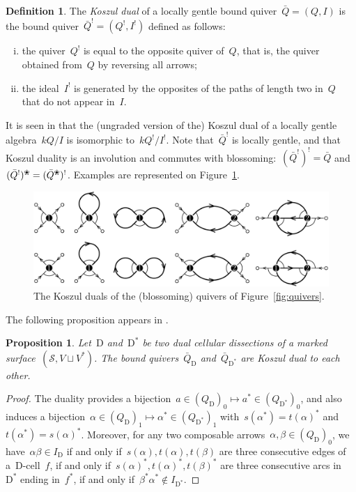 \documentclass{amsart}
\newtheorem{proposition}[theorem]{Proposition}
\theoremstyle{definition}
\newtheorem{definition}[theorem]{Definition}
\newcommand{\fref}[1]{Figure~\ref{#1}} %
\newcommand{\darkblue}{\color{darkblue}} %
\newcommand{\defn}[1]{\textsl{\darkblue #1}} %
\newcommand{\blossom}{^\text{\ding{96}}} %
\newcommand{\surface}{\mathcal{S}} %
\newcommand{\dual}{^*} %
\newcommand{\dissection}{\mathrm{D}} %
\newcommand{\koszul}{^!} %
\begin{document}
\begin{definition}
\label{defi:koszulDual}
The \defn{Koszul dual} of a locally gentle bound quiver~$\bar Q = (Q,I)$ is the bound quiver~$\bar Q\koszul = (Q\koszul, I\koszul)$ defined as follows:
\begin{enumerate}[(i)]
 \item the quiver~$Q\koszul$ is equal to the opposite quiver of~$Q$, that is, the quiver obtained from~$Q$ by reversing all arrows;
 \item the ideal~$I\koszul$ is generated by the opposites of the paths of length two in~$Q$ that do not appear in~$I$.
\end{enumerate}
\end{definition}
It is seen in \cite{BessenrodtHolm} that the (ungraded version of the) Koszul dual of a locally gentle algebra~$kQ/I$ is isomorphic to~$kQ\koszul/I\koszul$.
Note that~$\bar Q\koszul$ is locally gentle, and that Koszul duality is an involution and commutes with blossoming:~$(\bar Q\koszul)\koszul = \bar Q$ and~$(\bar Q\koszul)\blossom = (\bar Q\blossom)\koszul$.
Examples are represented on \fref{fig:koszulQuivers}.

\begin{figure}[t]
	\capstart
	\centerline{\includegraphics[scale=.6]{koszulQuivers}}
	\caption{The Koszul duals of the (blossoming) quivers of \fref{fig:quivers}.}
	\label{fig:koszulQuivers}
\end{figure}

The following proposition appears in \cite[Proposition 1.25]{OpperPlamondonSchroll}.  

\begin{proposition}
\label{prop:dualityKoszul1}
Let~$\dissection$ and~$\dissection\dual$ be two dual cellular dissections of a marked surface~$(\surface, V\sqcup V\dual)$.
The bound quivers~$\bar Q_{\dissection}$ and~$\bar Q_{\dissection\dual}$ are Koszul dual to each other.
\end{proposition}

\begin{proof}
The duality provides a bijection~$a\in (Q_\dissection)_0\mapsto a\dual\in (Q_{\dissection\dual})_0$, and also induces a bijection~${\alpha \in (Q_\dissection)_1 \mapsto \alpha\dual \in (Q_{\dissection\dual})_1}$ with~$s(\alpha\dual) = t(\alpha)\dual$ and~$t(\alpha\dual) = s(\alpha)\dual$.
 Moreover, for any two composable arrows~$\alpha,\beta\in(Q_\dissection)_0$, we have~$\alpha\beta\in I_\dissection$ if and only if~$s(\alpha),t(\alpha),t(\beta)$ are three consecutive edges of a~$\dissection$-cell~$f$, if and only if~$s(\alpha)\dual,t(\alpha)\dual,t(\beta)\dual$ are three consecutive arcs in~$\dissection\dual$ ending in~$f\dual$, if and only if~$\beta\dual\alpha\dual\notin I_{\dissection\dual}$.
\end{proof}
\end{document}
